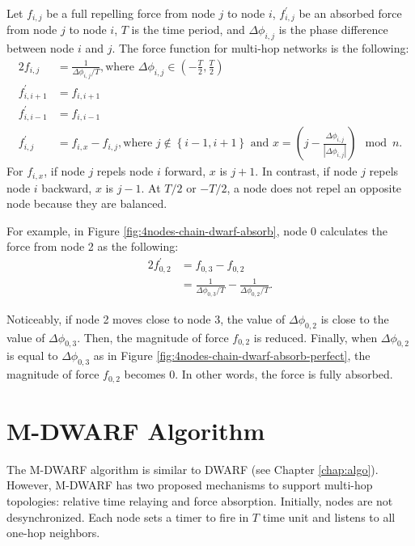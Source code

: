 Let $f_{i,j}$ be a full repelling force from node $j$ to node $i$, $f_{i,j}^{'}$ be an absorbed force from node $j$ to node $i$, $T$ is the time period, and $\Delta \phi_{i,j}$ is the phase difference between node $i$ and $j$. 
The force function for multi-hop networks is the following:
\begin{alignat}{2}
f_{i,j} &= \frac{1}{\Delta \phi_{i,j} / T}, \text{where }\Delta \phi_{i,j} \in (-\frac{T}{2}, \frac{T}{2}) \nonumber \\
f_{i,i + 1}^{'} &= f_{i,i + 1} \nonumber \\
f_{i, i - 1}^{'} &= f_{i,i - 1} \nonumber \\
f_{i,j}^{'} &= f_{i,x} - f_{i,j}, \text{where } j \notin \left\{i -1, i + 1\right\} \text{ and } x = (j - \frac{\Delta \phi_{i,j}}{|\Delta \phi_{i,j}|}) \mod n.
\label{eq:force-absorb}
\end{alignat}
For $f_{i,x}$, if node $j$ repels node $i$ forward, $x$ is $j + 1$. In contrast, if node $j$ repels node $i$ backward, $x$ is $j - 1$. At $T/2$ or $-T/2$, a node does not repel an opposite node because they are balanced.

For example, in Figure \ref{fig:4nodes-chain-dwarf-absorb}, node 0 calculates the force from node 2 as the following:
\begin{alignat}{2}
f_{0,2}^{'} &= f_{0,3} - f_{0,2} \nonumber \\
&= \frac{1}{\Delta \phi_{0,3} / T} - \frac{1}{\Delta \phi_{0,2} / T}. \nonumber
\end{alignat} 

Noticeably, if node 2 moves close to node 3, the value of $\Delta \phi_{0,2}$ is close to the value of $\Delta \phi_{0,3}$. Then, the magnitude of force $f_{0,2}$ is reduced. 
Finally, when $\Delta \phi_{0,2}$ is equal to $\Delta \phi_{0,3}$ as in Figure \ref{fig:4nodes-chain-dwarf-absorb-perfect}, the magnitude of force $f_{0,2}$ becomes 0. In other words, the force is fully absorbed. 

\section{M-DWARF Algorithm}
\label{sec:multihop-algo}
The M-DWARF algorithm is similar to DWARF (see Chapter \ref{chap:algo}). However, M-DWARF has two proposed mechanisms to support multi-hop topologies: relative time relaying and force absorption. Initially, nodes are not desynchronized. 
Each node sets a timer to fire in $T$ time unit and listens to all one-hop neighbors.

